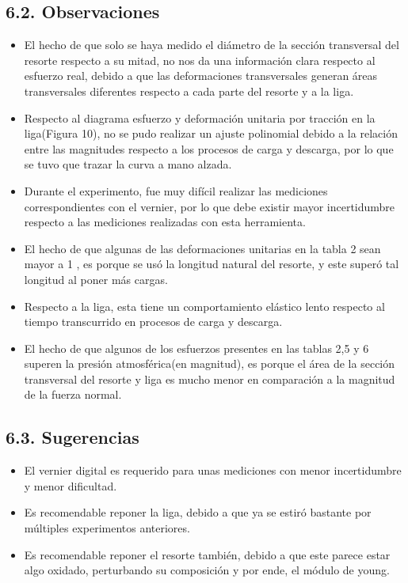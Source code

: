 \subsection{6.2. Observaciones}
\begin{itemize}
  \item El hecho de que solo se haya medido el diámetro de la sección transversal del resorte respecto a su mitad, no nos da una información clara respecto al esfuerzo real, debido a que las deformaciones transversales generan áreas transversales diferentes respecto a cada parte del resorte y a la liga.
  \item Respecto al diagrama esfuerzo y deformación unitaria por tracción en la liga(Figura 10), no se pudo realizar un ajuste polinomial debido a la relación entre las magnitudes respecto a los procesos de carga y descarga, por lo que se tuvo que trazar la curva a mano alzada.
  \item Durante el experimento, fue muy difícil realizar las mediciones correspondientes con el vernier, por lo que debe existir mayor incertidumbre respecto a las mediciones realizadas con esta herramienta.
  \item El hecho de que algunas de las deformaciones unitarias en la tabla 2 sean mayor a 1 , es porque se usó la longitud natural del resorte, y este superó tal longitud al poner más cargas.
  \item Respecto a la liga, esta tiene un comportamiento elástico lento respecto al tiempo transcurrido en procesos de carga y descarga.
  \item El hecho de que algunos de los esfuerzos presentes en las tablas 2,5 y 6 superen la presión atmosférica(en magnitud), es porque el área de la sección transversal del resorte y liga es mucho menor en comparación a la magnitud de la fuerza normal.
\end{itemize}

\subsection{6.3. Sugerencias}
\begin{itemize}
  \item El vernier digital es requerido para unas mediciones con menor incertidumbre y menor dificultad.
  \item Es recomendable reponer la liga, debido a que ya se estiró bastante por múltiples experimentos anteriores.
  \item Es recomendable reponer el resorte también, debido a que este parece estar algo oxidado, perturbando su composición y por ende, el módulo de young.
\end{itemize}

